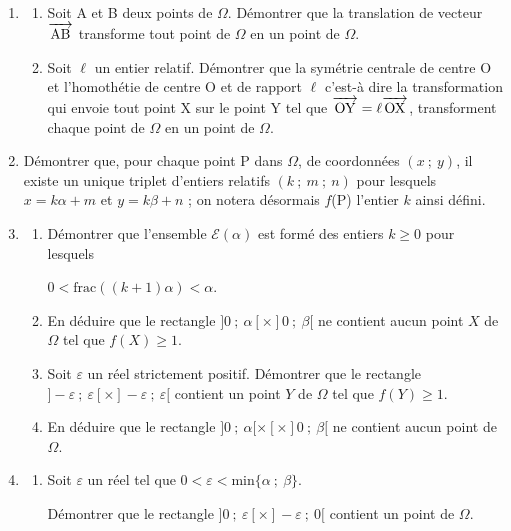 \documentclass[landscape,twocolumn,leqno,a4paper,10pt]{report} %
\newcommand{\vect}[1]{\overrightarrow{\,\mathstrut#1\,}}
\renewcommand{\epsilon}{\varepsilon}		%
\begin{document}
\begin{enumerate}[resume]
\item
	\begin{enumerate}
		\item Soit A et B deux points de $\Omega$. Démontrer que la translation de vecteur $\vect{\text{AB}}$ transforme tout point de $\Omega$ en un point de $\Omega$.
		\item Soit $\ell$ un entier relatif. Démontrer que la symétrie centrale de centre O et l'homothétie de centre O et de rapport $\ell $ c'est-à dire la transformation qui envoie tout point X sur le point Y tel que $\vect{\text{OY}} = \ell \vect{\text{OX}}$, transforment chaque point de $\Omega$ en un point de $\Omega$.
	\end{enumerate}
\item Démontrer que, pour chaque point P dans $\Omega$, de coordonnées $(x~;~y)$, il existe un unique triplet d'entiers relatifs $(k~;~m~;~n)$ pour lesquels $x = k\alpha + m$ et $y = k\beta + n$ ; on notera désormais $f$(P) l'entier $k$ ainsi défini.
\item%
	\begin{enumerate}
		\item Démontrer que l'ensemble $\mathcal{E}(\alpha)$ est formé des entiers $k \geqslant 0$ pour lesquels 
		
$0 < \text{frac}((k + 1)\alpha) < \alpha$.
		\item En déduire que le rectangle $]0~;~\alpha[ \times ]0~;~\beta[$ ne contient aucun point $X$ de $\Omega$ tel que $f(X) \geqslant 1$.
		\item Soit $\epsilon$ un réel strictement positif. Démontrer que le rectangle $]- \epsilon~;~\epsilon[ \times ]- \epsilon~;~\epsilon[$ contient un
point $Y$ de $\Omega$ tel que $f(Y) \geqslant 1$.
		\item En déduire que le rectangle $]0~;~\alpha[ \times [ \times ]0~;~\beta[$ ne contient aucun point de $\Omega$.
	\end{enumerate}
\item%
	\begin{enumerate}
		\item Soit $\epsilon$ un réel tel que $0 < \epsilon < \text{min}\{\alpha~;~\beta\}$.

Démontrer que le rectangle $]0~;~\epsilon[ \times ]-\epsilon~;~0[$ contient un point de $\Omega$.


\end{enumerate}
\end{enumerate}
\end{document}
